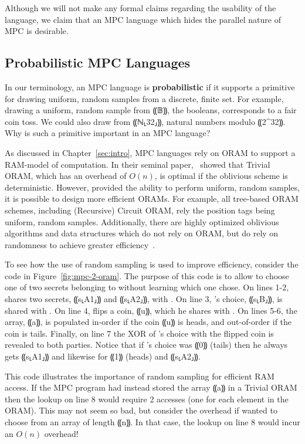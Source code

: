 Although we will not make any formal claims regarding the usability of the language, we claim that an MPC language which hides the parallel
nature of MPC is desirable.

\subsection{Probabilistic MPC Languages}
\label{subsec:background-properties-probabilistic}

In our terminology, an MPC language is \textbf{probabilistic} if it supports a primitive for drawing uniform, random samples from a
discrete, finite set. For example, drawing a uniform, random sample from ⸨𝔹⸩, the booleans, corresponds to a fair coin toss. We
could also draw from ⸨ℕ⸤32⸥⸩, natural numbers modulo ⸨2^{32}⸩. Why is such a primitive important in an MPC language?

As discussed in Chapter~\ref{sec:intro}, MPC languages rely on ORAM to support a RAM-model of computation. In their seminal paper,~\citet{}
showed that Trivial ORAM, which has an overhead of $O(n)$, is optimal if the oblivious scheme is deterministic. However, provided the ability
to perform uniform, random samples, it is possible to design more efficient ORAMs. For example, all tree-based ORAM schemes, including
(Recursive) Circuit ORAM, rely the position tags being uniform, random samples. Additionally, there are highly
optimized oblivious algorithms and data structures which do not rely on ORAM, but do rely on randomness to achieve greater efficiency~\cite{}.

To see how the use of random sampling is used to improve efficiency, consider the \mpc{} code in Figure~\ref{fig:mpc-2-oram}. The purpose of
this code is to allow \bob to choose one of two secrets belonging to \alice without \alice learning which one \bob chose. On lines 1-2,
\alice shares two secrets, ⸨s⸤A1⸥⸩ and ⸨s⸤A2⸥⸩, with \bob. On line 3, \bob's choice, ⸨s⸤B⸥⸩, is shared with \alice.
On line 4, \bob flips a coin, ⸨u⸩, which he shares with \alice. On lines 5-6, the array, ⸨a⸩, is populated
in-order if the coin ⸨u⸩ is heads, and out-of-order if the coin is tails. Finally, on line 7 the XOR of \bob's choice with the flipped
coin is revealed to both parties. Notice that if \bob's choice was ⸨0⸩ (tails) then he always gets ⸨s⸤A1⸥⸩ and
likewise for ⸨1⸩ (heads) and ⸨s⸤A2⸥⸩.

This code illustrates the importance of random sampling for efficient RAM access. If the MPC program had instead stored the array ⸨a⸩ in
a Trivial ORAM then the lookup on line 8 would require 2 accesses (one for each element in the ORAM). This may not seem so bad, but consider
the overhead if \bob wanted to choose from an array of length ⸨n⸩. In that case, the lookup on line 8 would incur an $O(n)$ overhead!

